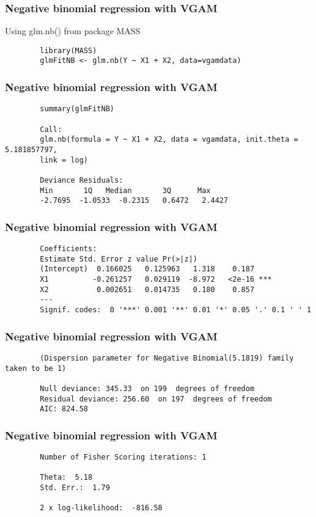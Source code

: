 \documentclass{beamer}
\begin{document}
	\begin{frame}[fragile]
		\frametitle{Negative binomial regression with VGAM}
		
		Using glm.nb() from package MASS
		\begin{verbatim}
		library(MASS)
		glmFitNB <- glm.nb(Y ~ X1 + X2, data=vgamdata)
		\end{verbatim}
	\end{frame}
	\begin{frame}[fragile]
		\frametitle{Negative binomial regression with VGAM}
		\begin{verbatim}
		summary(glmFitNB)
		
		Call:
		glm.nb(formula = Y ~ X1 + X2, data = vgamdata, init.theta = 5.181857797, 
		link = log)
		
		Deviance Residuals: 
		Min       1Q   Median       3Q      Max  
		-2.7695  -1.0533  -0.2315   0.6472   2.4427  
		\end{verbatim}
	\end{frame}
	\begin{frame}[fragile]
		\frametitle{Negative binomial regression with VGAM}
		\begin{verbatim}
		Coefficients:
		Estimate Std. Error z value Pr(>|z|)    
		(Intercept)  0.166025   0.125963   1.318    0.187    
		X1          -0.261257   0.029119  -8.972   <2e-16 ***
		X2           0.002651   0.014735   0.180    0.857    
		---
		Signif. codes:  0 '***' 0.001 '**' 0.01 '*' 0.05 '.' 0.1 ' ' 1
		\end{verbatim}
	\end{frame}
	\begin{frame}[fragile]
		\frametitle{Negative binomial regression with VGAM}
		\begin{verbatim}
		(Dispersion parameter for Negative Binomial(5.1819) family taken to be 1)
		
		Null deviance: 345.33  on 199  degrees of freedom
		Residual deviance: 256.60  on 197  degrees of freedom
		AIC: 824.58
		\end{verbatim}
	\end{frame}
	\begin{frame}[fragile]
		\frametitle{Negative binomial regression with VGAM}
		\begin{verbatim}
		Number of Fisher Scoring iterations: 1
		
		Theta:  5.18 
		Std. Err.:  1.79 
		
		2 x log-likelihood:  -816.58 
		\end{verbatim}
	\end{frame}
\end{document}
